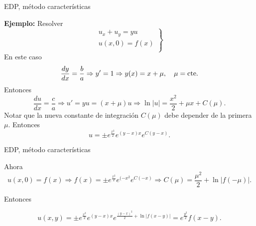 \documentclass[handout,hyperref={colorlinks=true}]{beamer}
\begin{document}
\begin{frame}{EDP, método características}

\textbf{Ejemplo:} Resolver
\begin{equation}\label{eq:EDP_gral_1orden}
  \left.\begin{array}{l}
  u_x+u_y=yu\\
  u(x,0)=f(x)\\
\end{array}\right\}
\end{equation}
En este caso
\[\frac{dy}{dx}=\frac{b}{a}\Rightarrow y'=1\Rightarrow y(x)=x+\mu,\quad\mu=\hbox{cte}.\]
Entonces
\[\frac{du}{dx}=\frac{c}{a}\Rightarrow u'=yu=(x+\mu)u\Rightarrow \ln|u|=\frac{x^2}{2}+\mu x+C(\mu).\]
Notar que la nueva constante de integración $C(\mu)$ debe depender de la primera $\mu$. Entonces
\[u=\pm e^{\frac{x^2}{2}}e^{(y-x)x}e^{C(y-x)}.\]

\end{frame}

\begin{frame}{EDP, método características}

Ahora
\[u(x,0)=f(x)\Rightarrow f(x)=\pm e^{\frac{x^2}{2}}e^{(-x^2}e^{C(-x)}\Rightarrow C(\mu)=\frac{\mu^2}{2}+\ln|f(-\mu)|.\]

Entonces

\[u(x,y)=\pm e^{\frac{x^2}{2}}e^{(y-x)x}e^{\frac{(y-x)^2}{2}+\ln|f(x-y)|        }
=e^{\frac{y^2}{2}}f(x-y).\]



\end{frame}
\end{document}
